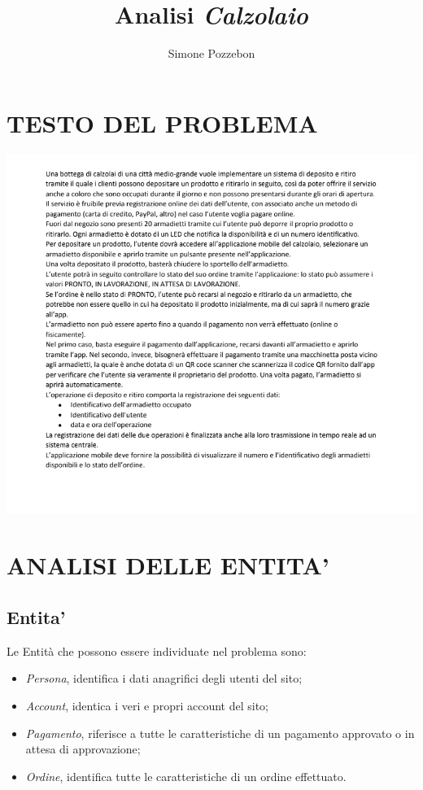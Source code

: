 \documentclass[hidelinks,  a4paper, 14pt]{report}
\title{Analisi \textit{Calzolaio}}
\author{Simone Pozzebon}
\begin{document}
\maketitle
\tableofcontents
\newpage

\section{TESTO DEL PROBLEMA}
\begin{center}
\includegraphics[scale=0.4]{img/2021-03-23-081439_796x698_scrot.png}
\end{center}

\section{ANALISI DELLE ENTITA'}
\subsection{Entita'}
Le Entità che possono essere individuate nel problema sono: 
\begin{itemize}
\item \textit{Persona}, identifica i dati anagrifici degli utenti del sito;
\item \textit{Account}, identica i veri e propri account del sito;
\item \textit{Pagamento}, riferisce a tutte le caratteristiche di un pagamento approvato o in attesa di approvazione;
\item \textit{Ordine}, identifica tutte le caratteristiche di un ordine effettuato.
\end{itemize}
\newpage
\end{document}
